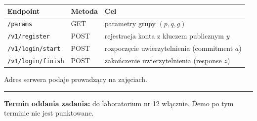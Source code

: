 \documentclass[
]{article}
\newcounter{none} %
\let\oldrule\rule
\renewcommand{\rule}[2]{\noindent\oldrule{\linewidth}{0.4pt}}
\begin{document}
{\def\LTcaptype{none} %
\begin{longtable}[]{@{}
  >{\raggedright\arraybackslash}p{}
  >{\raggedright\arraybackslash}p{}
  >{\raggedright\arraybackslash}p{}@{}}
\toprule\noalign{}
\begin{minipage}[b]{\linewidth}\raggedright
Endpoint
\end{minipage} & \begin{minipage}[b]{\linewidth}\raggedright
Metoda
\end{minipage} & \begin{minipage}[b]{\linewidth}\raggedright
Cel
\end{minipage} \\
\midrule\noalign{}
\endhead
\bottomrule\noalign{}
\endlastfoot
\texttt{/params} & GET & parametry grupy \((p, q, g)\) \\
\texttt{/v1/register} & POST & rejestracja konta z kluczem publicznym
\(y\) \\
\texttt{/v1/login/start} & POST & rozpoczęcie uwierzytelnienia
(commitment \(a\)) \\
\texttt{/v1/login/finish} & POST & zakończenie uwierzytelnienia
(response \(z\)) \\
\end{longtable}
}

Adres serwera podaje prowadzący na zajęciach.

\begin{center}\rule{0.5\linewidth}{0.5pt}\end{center}

\textbf{Termin oddania zadania:} do laboratorium nr 12 włącznie. Demo po
tym terminie nie jest punktowane.
\end{document}
